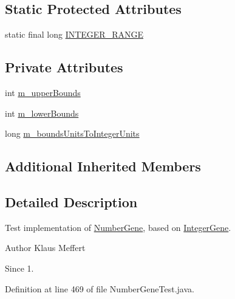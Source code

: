 \subsection*{Static Protected Attributes}
\begin{DoxyCompactItemize}
\item 
static final long \hyperlink{classorg_1_1jgap_1_1impl_1_1_number_gene_test_1_1_number_gene_impl_a562928068f038dd348e39b41bf0d7ab4}{I\-N\-T\-E\-G\-E\-R\-\_\-\-R\-A\-N\-G\-E}
\end{DoxyCompactItemize}
\subsection*{Private Attributes}
\begin{DoxyCompactItemize}
\item 
int \hyperlink{classorg_1_1jgap_1_1impl_1_1_number_gene_test_1_1_number_gene_impl_aeb2f27970bdd0a0823bb778e4b1a4781}{m\-\_\-upper\-Bounds}
\item 
int \hyperlink{classorg_1_1jgap_1_1impl_1_1_number_gene_test_1_1_number_gene_impl_a253cb8ed048bd7f618c24faf492c557e}{m\-\_\-lower\-Bounds}
\item 
long \hyperlink{classorg_1_1jgap_1_1impl_1_1_number_gene_test_1_1_number_gene_impl_a1e878330151ef32fbfe9161a431b2990}{m\-\_\-bounds\-Units\-To\-Integer\-Units}
\end{DoxyCompactItemize}
\subsection*{Additional Inherited Members}


\subsection{Detailed Description}
Test implementation of \hyperlink{classorg_1_1jgap_1_1impl_1_1_number_gene}{Number\-Gene}, based on \hyperlink{classorg_1_1jgap_1_1impl_1_1_integer_gene}{Integer\-Gene}.

\begin{DoxyAuthor}{Author}
Klaus Meffert 
\end{DoxyAuthor}
\begin{DoxySince}{Since}
1. 
\end{DoxySince}


Definition at line 469 of file Number\-Gene\-Test.\-java.



